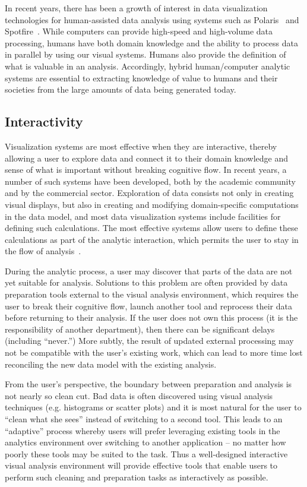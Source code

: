 In recent years, there has been a growth of interest in data visualization technologies for human-assisted data analysis using systems such as Polaris~\cite{Stolte:2008} and Spotfire~\cite{Ahlberg:1996}. While computers can provide high-speed and high-volume data processing, humans have both domain knowledge and the ability to process data in parallel by using our visual systems. Humans also provide the definition of what is valuable in an analysis. Accordingly, hybrid human/computer analytic systems are essential to extracting knowledge of value to humans and their societies from the large amounts of data being generated today.

\subsection{Interactivity}
Visualization systems are most effective when they are interactive, thereby allowing a user to explore data and connect it to their domain knowledge and sense of what is important without breaking cognitive flow. In recent years, a number of such systems have been developed, both by the academic community and by the commercial sector. Exploration of data consists not only in creating visual displays, but also in creating and modifying domain-specific computations in the data model, and most data visualization systems include facilities for defining such calculations. The most effective systems allow users to define these calculations as part of the analytic interaction, which permits the user to stay in the flow of analysis~\cite{Morton:2012}.

During the analytic process, a user may discover that parts of the data are not yet suitable for analysis. Solutions to this problem are often provided by data preparation tools external to the visual analysis environment, which requires the user to break their cognitive flow, launch another tool and reprocess their data before returning to their analysis. If the user does not own this process (\eg it is the responsibility of another department), then there can be significant delays (including ``never.'') More subtly, the result of updated external processing may not be compatible with the user's existing work, which can lead to more time lost reconciling the new data model with the existing analysis.

From the user's perspective, the boundary between preparation and analysis is not nearly so clean cut. Bad data is often discovered using visual analysis techniques (e.g. histograms or scatter plots) and it is most natural for the user to ``clean what she sees'' instead of switching to a second tool. This leads to an ``adaptive'' process whereby users will prefer leveraging existing tools in the analytics environment over switching to another application -- no matter how poorly these tools may be suited to the task. Thus a well-designed interactive visual analysis environment will provide effective tools that enable users to perform such cleaning and preparation tasks as interactively as possible.

